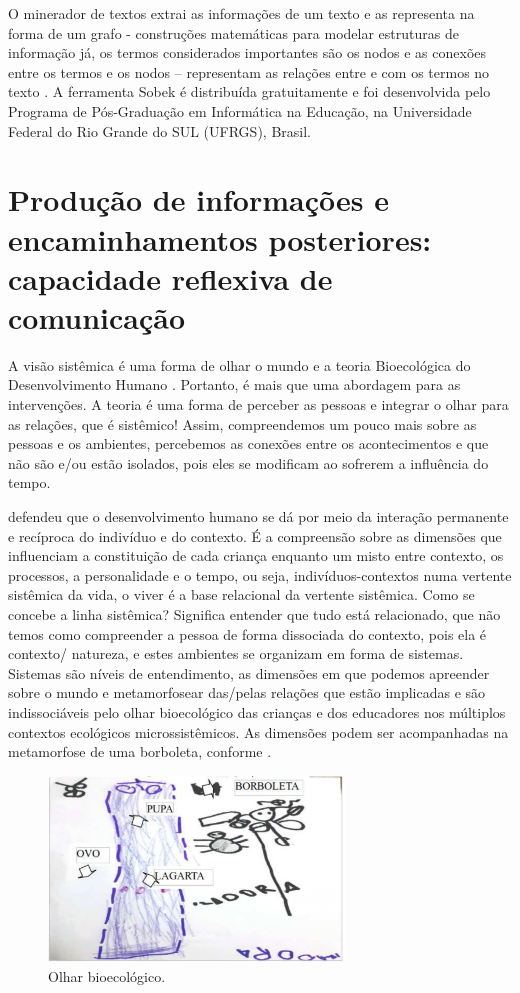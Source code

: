\documentclass{textolivre-html}
\begin{document}
O minerador de textos extrai as informações de um texto e as representa na forma de um grafo - construções matemáticas para modelar estruturas de informação já, os termos considerados importantes são os nodos e as conexões entre os termos e os nodos – representam as relações entre e com os termos no texto \cite{epstein2017}. A ferramenta Sobek é distribuída gratuitamente e foi desenvolvida pelo Programa de Pós-Graduação em Informática na Educação, na Universidade Federal do Rio Grande do SUL (UFRGS), Brasil.




\section{Produção de informações e encaminhamentos posteriores: capacidade reflexiva de comunicação}\label{sec-producao}

A visão sistêmica é uma forma de olhar o mundo e a teoria Bioecológica do Desenvolvimento Humano \cite{brofen2011}. Portanto, é mais que uma abordagem para as intervenções. A teoria é uma forma de perceber as pessoas e integrar o olhar para as relações, que é sistêmico! Assim, compreendemos um pouco mais sobre as pessoas e os ambientes, percebemos as conexões entre os acontecimentos e que não são e/ou estão isolados, pois eles se modificam ao sofrerem a influência do tempo. 

\textcite{brofen2011} defendeu que o desenvolvimento humano se dá por meio da interação permanente e recíproca do indivíduo e do contexto. É a compreensão sobre as dimensões que influenciam a constituição de cada criança enquanto um misto entre contexto, os processos, a personalidade e o tempo, ou seja, indivíduos-contextos numa vertente sistêmica da vida, o viver é a base relacional da vertente sistêmica. Como se concebe a linha sistêmica? Significa entender que tudo está relacionado, que não temos como compreender a pessoa de forma dissociada do contexto, pois ela é contexto/ natureza, e estes ambientes se organizam em forma de sistemas. Sistemas são níveis de entendimento, as dimensões em que podemos apreender sobre o mundo e metamorfosear das/pelas relações que estão implicadas e são indissociáveis pelo olhar bioecológico das crianças e dos educadores nos múltiplos contextos ecológicos microssistêmicos. As dimensões podem ser acompanhadas na metamorfose de uma borboleta, conforme . 

\begin{figure}[h!]
 \centering
 \includegraphics[width=0.7\textwidth]{figure03.pdf}
 \caption{Olhar bioecológico.}
 \label{fig-fig03}
\end{figure}
\end{document}
